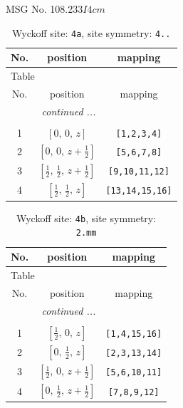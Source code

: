 \documentclass[fleqn,8pt]{jsarticle}
\begin{document}
\setcounter{MaxMatrixCols}{32}

\renewcommand{\tablename}{Table~}
\renewcommand{\figurename}{Figure~}
\begin{center}
\LARGE
MSG No. 108.233\quad$I4cm$
\end{center}
\renewcommand{\arraystretch}{1.2}
\begin{longtable}{ccc}
\caption{Wyckoff site: {\tt 4a}, site symmetry: {\tt 4..}}
 \\
 \hline \hline
No. & position & mapping \\ \hline \endfirsthead

\multicolumn{2}{l}{\tablename\ \thetable{}} \\
 \hline \hline
No. & position & mapping \\ \hline \endhead

 \hline \hline
\multicolumn{2}{r}{\footnotesize\it continued ...} \\ \endfoot

 \hline \hline
\multicolumn{2}{r}{} \\ \endlastfoot

1 & $\left[ 0,\, 0,\, z \right]$ & {\tt [1,2,3,4]} \\ \hline
2 & $\left[ 0,\, 0,\, z + \frac{1}{2} \right]$ & {\tt [5,6,7,8]} \\ \hline
3 & $\left[ \frac{1}{2},\, \frac{1}{2},\, z + \frac{1}{2} \right]$ & {\tt [9,10,11,12]} \\ \hline
4 & $\left[ \frac{1}{2},\, \frac{1}{2},\, z \right]$ & {\tt [13,14,15,16]} \\
\end{longtable}
\renewcommand{\arraystretch}{1.2}
\begin{longtable}{ccc}
\caption{Wyckoff site: {\tt 4b}, site symmetry: {\tt 2.mm}}
 \\
 \hline \hline
No. & position & mapping \\ \hline \endfirsthead

\multicolumn{2}{l}{\tablename\ \thetable{}} \\
 \hline \hline
No. & position & mapping \\ \hline \endhead

 \hline \hline
\multicolumn{2}{r}{\footnotesize\it continued ...} \\ \endfoot

 \hline \hline
\multicolumn{2}{r}{} \\ \endlastfoot

1 & $\left[ \frac{1}{2},\, 0,\, z \right]$ & {\tt [1,4,15,16]} \\ \hline
2 & $\left[ 0,\, \frac{1}{2},\, z \right]$ & {\tt [2,3,13,14]} \\ \hline
3 & $\left[ \frac{1}{2},\, 0,\, z + \frac{1}{2} \right]$ & {\tt [5,6,10,11]} \\ \hline
4 & $\left[ 0,\, \frac{1}{2},\, z + \frac{1}{2} \right]$ & {\tt [7,8,9,12]} \\
\end{longtable}
\end{document}
